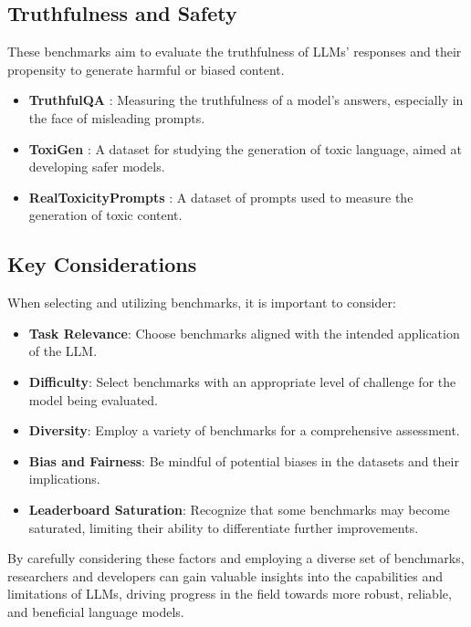 \subsection{Truthfulness and Safety}

These benchmarks aim to evaluate the truthfulness of LLMs' responses and their propensity to generate harmful or biased content.

\begin{itemize}
    \item \textbf{TruthfulQA} \cite{lin2021truthfulqa}: Measuring the truthfulness of a model's answers, especially in the face of misleading prompts.
    \item \textbf{ToxiGen} \cite{hartvigsen2022toxigen}: A dataset for studying the generation of toxic language, aimed at developing safer models.
    \item \textbf{RealToxicityPrompts} \cite{gehman2020realtoxicityprompts}: A dataset of prompts used to measure the generation of toxic content.
\end{itemize}

\subsection{Key Considerations}

When selecting and utilizing benchmarks, it is important to consider:

\begin{itemize}
    \item \textbf{Task Relevance}: Choose benchmarks aligned with the intended application of the LLM.
    \item \textbf{Difficulty}: Select benchmarks with an appropriate level of challenge for the model being evaluated.
    \item \textbf{Diversity}: Employ a variety of benchmarks for a comprehensive assessment.
    \item \textbf{Bias and Fairness}: Be mindful of potential biases in the datasets and their implications.
    \item \textbf{Leaderboard Saturation}: Recognize that some benchmarks may become saturated, limiting their ability to differentiate further improvements.
\end{itemize}

By carefully considering these factors and employing a diverse set of benchmarks, researchers and developers can gain valuable insights into the capabilities and limitations of LLMs, driving progress in the field towards more robust, reliable, and beneficial language models.


